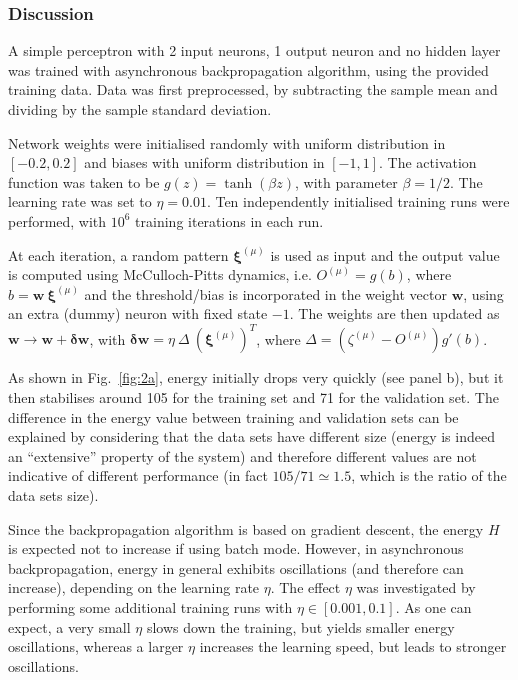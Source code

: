 \documentclass[12pt,titlepage]{article}
\begin{document}
\vspace*{-0.4cm}
\subsubsection*{Discussion}
\vspace*{-0.3cm}
A simple perceptron with 2 input neurons, 1 output neuron and no hidden layer was trained with asynchronous backpropagation algorithm, using the provided training data. Data was first preprocessed, by subtracting the sample mean and dividing by the sample standard deviation.

Network weights were initialised randomly with uniform distribution in $[−0.2, 0.2]$ and biases with uniform distribution in $[−1, 1]$. The activation function was taken to be $g(z) = \tanh(\beta z)$, with parameter $\beta = 1/2$. The learning rate was set to $\eta = 0.01$. Ten independently initialised training runs were performed, with $10^6$ training iterations in each run.

At each iteration, a random pattern $\bm{\xi}^{(\mu)}$ is used as input and the output value is computed using McCulloch-Pitts dynamics, i.e. $O^{(\mu)} = g(b)$, where $b = \bm{w} \ \bm{\xi}^{(\mu)}$ and the threshold/bias is incorporated in the weight vector $\bm{w}$, using an extra (dummy) neuron with fixed state $-1$. The weights are then updated as $\bm{w} \rightarrow \bm{w}+ \bm{\delta w}$, with $\bm{\delta w} = \eta \ \Delta \ (\bm{\xi}^{(\mu)})^T$, where $\Delta = (\zeta^{(\mu)} - O^{(\mu)}) g'(b)$.

As shown in Fig.~\ref{fig:2a}, energy initially drops very quickly (see panel b), but it then stabilises around 105 for the training set and 71 for the validation set. The difference in the energy value between training and validation sets can be explained by considering that the data sets have different size (energy is indeed an ``extensive'' property of the system) and therefore different values are not indicative of different performance (in fact $105/71 \simeq 1.5$, which is the ratio of the data sets size).

Since the backpropagation algorithm is based on gradient descent, the energy $H$ is expected not to increase if using batch mode. However, in asynchronous backpropagation, energy in general exhibits oscillations (and therefore can increase), depending on the learning rate $\eta$. The effect $\eta$ was investigated by performing some additional training runs with ${\eta \in [0.001, 0.1]}$. As one can expect, a very small $\eta$ slows down the training, but yields smaller energy oscillations, whereas a larger $\eta$ increases the learning speed, but leads to stronger oscillations. 
\end{document}
